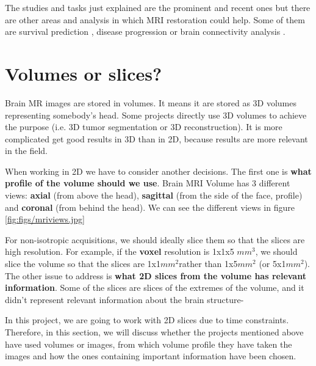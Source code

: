 The studies and tasks just explained are the prominent and recent ones but there are other areas and analysis in which MRI restoration could help. Some of them are survival prediction \cite{AnexoReviewAditional}, disease progression \cite{AnexoProgression} or brain connectivity analysis   \cite{AnexoConnectivity}.

\section{Volumes or slices?}
\label{section:soa_vols_slices}

Brain MR images are stored in volumes. It means it are stored as 3D volumes representing somebody's head. Some projects directly use 3D volumes to achieve the purpose (i.e. 3D tumor segmentation or 3D reconstruction). It is more complicated get good results in 3D than in 2D, because results are more relevant in the field. 

When working in 2D we have to consider another decisions. The first one is \textbf{what profile of the volume should we use}. Brain MRI Volume has 3 different views: \textbf{axial} (from above the head), \textbf{sagittal} (from the side of the face, profile) and \textbf{coronal} (from behind the head). We can see the different views in figure \ref{fig:figs/mriviews.jpg}


For non-isotropic acquisitions, we should ideally slice them so that the slices are high resolution. For example, if the \textbf{voxel} resolution is 1x1x5 $mm^3$, we should slice the volume so that the slices are 1x1$mm^2$rather than 1x5$mm^2$ (or 5x1$mm^2$). The other issue to address is \textbf{what 2D slices from the volume has relevant information}. Some of the slices are slices of the extremes of the volume, and it didn't represent relevant information about the brain structure-

In this project, we are going to work with 2D slices due to time constraints. Therefore, in this section, we will discuss whether the projects mentioned above have used volumes or images, from which volume profile they have taken the images and how the ones containing important information have been chosen. 

